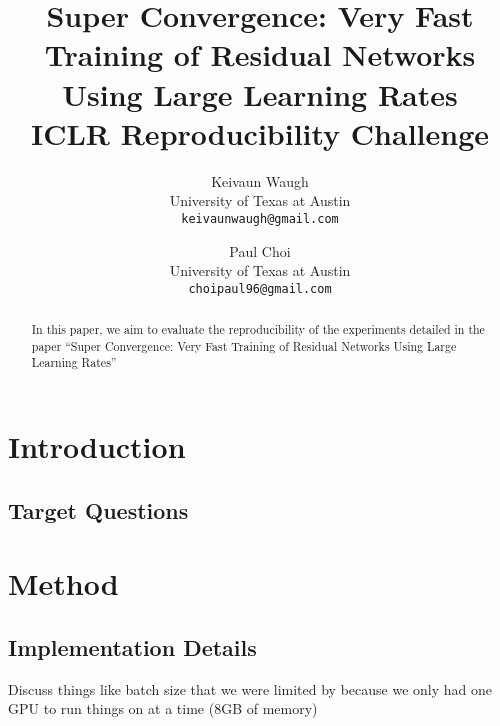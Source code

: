 \documentclass[10pt,twocolumn,letterpaper]{article}
\begin{document}
\title{
    Super Convergence: Very Fast Training of Residual Networks Using Large
    Learning Rates\\
    \large ICLR Reproducibility Challenge}

\author{Keivaun Waugh\\
University of Texas at Austin\\
{\tt\small keivaunwaugh@gmail.com}
\and
Paul Choi\\
University of Texas at Austin\\
{\tt\small choipaul96@gmail.com}
}

\maketitle

\begin{abstract}
In this paper, we aim to evaluate the reproducibility of the experiments
    detailed in the paper ``Super Convergence: Very Fast Training of Residual
    Networks Using Large Learning Rates'' \cite{SuperConvergence}
\end{abstract}

\section{Introduction}

\subsection{Target Questions}

\section{Method}
\label{sec:method}

\subsection{Implementation Details}
Discuss things like batch size that we were limited by because we only had
one GPU to run things on at a time (8GB of memory)
\end{document}
